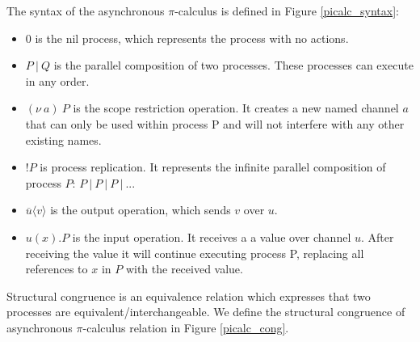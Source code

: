 \documentclass[12pt,twoside]{report}
\begin{document}
The syntax of the asynchronous $\pi$-calculus is defined in Figure \ref{picalc_syntax}:
\begin{itemize}
    \item $0$ is the nil process, which represents the process with no actions.
    \item $P\ |\ Q$ is the parallel composition of two processes. These processes can execute in any order.
    \item $(\nu\ a)\ P$ is the scope restriction operation. It creates a new named channel $a$ that can only be used within process P and will not interfere with any other existing names.
    \item $!P$ is process replication. It represents the infinite parallel composition of process $P$: $P\ |\ P\ |\ P\ |\ ...$
    \item $\overline{u}\langle v \rangle$ is the output operation, which sends $v$ over $u$.
    \item $u(x).P$ is the input operation. It receives a a value over channel $u$. After receiving the value  it will continue executing process P, replacing all references to $x$ in $P$ with the received value.
\end{itemize}

Structural congruence is an equivalence relation which expresses that two processes are equivalent/interchangeable. We define the structural congruence of asynchronous $\pi$-calculus relation in Figure \ref{picalc_cong}.\\
\end{document}
